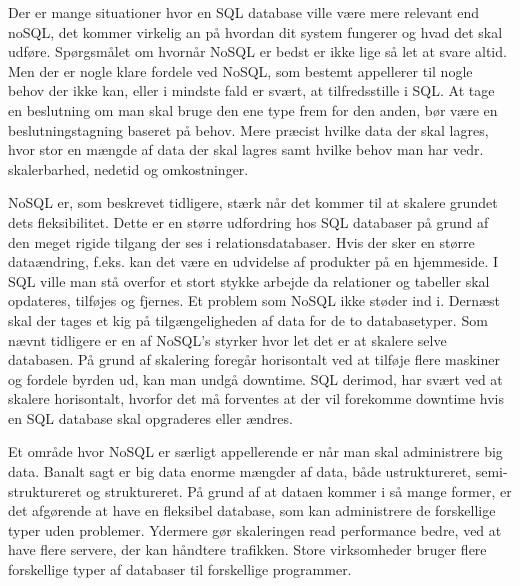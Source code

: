Der er mange situationer hvor en SQL database ville være mere relevant end noSQL, 
det kommer virkelig an på hvordan dit system fungerer og hvad det skal udføre. Spørgsmålet om hvornår NoSQL er bedst er ikke lige så let at svare altid. 
Men der er nogle klare fordele ved NoSQL, som bestemt appellerer til nogle behov der ikke kan, 
eller i mindste fald er svært, at tilfredsstille i SQL. 
At tage en beslutning om man skal bruge den ene type frem for den anden, 
bør være en beslutningstagning baseret på behov. Mere præcist hvilke data der skal lagres, 
hvor stor en mængde af data der skal lagres samt hvilke behov man har vedr. skalerbarhed, nedetid og omkostninger.\newline

NoSQL er, som beskrevet tidligere, stærk når det kommer til at skalere grundet dets fleksibilitet. 
Dette er en større udfordring hos SQL databaser på grund af den meget rigide tilgang der ses i relationsdatabaser. 
Hvis der sker en større dataændring, f.eks. kan det være en udvidelse af produkter på en hjemmeside. 
I SQL ville man stå overfor et stort stykke arbejde da relationer og tabeller skal opdateres, 
tilføjes og fjernes. Et problem som NoSQL ikke støder ind i. Dernæst skal der tages et kig på tilgængeligheden af data for de to databasetyper. 
Som nævnt tidligere er en af NoSQL’s styrker hvor let det er at skalere selve databasen. 
På grund af skalering foregår horisontalt ved at tilføje flere maskiner og fordele byrden ud, 
kan man undgå downtime. SQL derimod, har svært ved at skalere horisontalt, 
hvorfor det må forventes at der vil forekomme downtime hvis en SQL database skal opgraderes eller ændres.\newline

Et område hvor NoSQL er særligt appellerende er når man skal administrere big data. 
Banalt sagt er big data enorme mængder af data, både ustruktureret, semi-struktureret og struktureret. 
På grund af at dataen kommer i så mange former, er det afgørende at have en fleksibel database, 
som kan administrere de forskellige typer uden problemer. Ydermere gør skaleringen read performance bedre, 
ved at have flere servere, der kan håndtere trafikken.
Store virksomheder bruger flere forskellige typer af databaser til forskellige programmer. \newline
